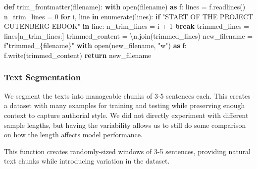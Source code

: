 \documentclass[
]{article}
\newenvironment{Shaded}{}{}
\newcommand{\BuiltInTok}[1]{\textcolor[rgb]{0.00,0.50,0.00}{#1}}
\newcommand{\CharTok}[1]{\textcolor[rgb]{0.25,0.44,0.63}{#1}}
\newcommand{\ControlFlowTok}[1]{\textcolor[rgb]{0.00,0.44,0.13}{\textbf{#1}}}
\newcommand{\DecValTok}[1]{\textcolor[rgb]{0.25,0.63,0.44}{#1}}
\newcommand{\ImportTok}[1]{\textcolor[rgb]{0.00,0.50,0.00}{\textbf{#1}}}
\newcommand{\KeywordTok}[1]{\textcolor[rgb]{0.00,0.44,0.13}{\textbf{#1}}}
\newcommand{\NormalTok}[1]{#1}
\newcommand{\OperatorTok}[1]{\textcolor[rgb]{0.40,0.40,0.40}{#1}}
\newcommand{\SpecialCharTok}[1]{\textcolor[rgb]{0.25,0.44,0.63}{#1}}
\newcommand{\SpecialStringTok}[1]{\textcolor[rgb]{0.73,0.40,0.53}{#1}}
\newcommand{\StringTok}[1]{\textcolor[rgb]{0.25,0.44,0.63}{#1}}
\begin{document}
\begin{Shaded}
\begin{Highlighting}[]
\KeywordTok{def}\NormalTok{ trim\_frontmatter(filename):}
    \ControlFlowTok{with} \BuiltInTok{open}\NormalTok{(filename) }\ImportTok{as}\NormalTok{ f:}
\NormalTok{        lines }\OperatorTok{=}\NormalTok{ f.readlines()}
\NormalTok{    n\_trim\_lines }\OperatorTok{=} \DecValTok{0}
    \ControlFlowTok{for}\NormalTok{ i, line }\KeywordTok{in} \BuiltInTok{enumerate}\NormalTok{(lines):}
        \ControlFlowTok{if} \StringTok{"START OF THE PROJECT GUTENBERG EBOOK"} \KeywordTok{in}\NormalTok{ line:}
\NormalTok{            n\_trim\_lines }\OperatorTok{=}\NormalTok{ i }\OperatorTok{+} \DecValTok{1}
            \ControlFlowTok{break}
\NormalTok{    trimmed\_lines }\OperatorTok{=}\NormalTok{ lines[n\_trim\_lines:]}
\NormalTok{    trimmed\_content }\OperatorTok{=} \StringTok{\textquotesingle{}}\CharTok{\textbackslash{}n}\StringTok{\textquotesingle{}}\NormalTok{.join(trimmed\_lines)}
\NormalTok{    new\_filename }\OperatorTok{=} \SpecialStringTok{f"trimmed\_}\SpecialCharTok{\{}\NormalTok{filename}\SpecialCharTok{\}}\SpecialStringTok{"}
    \ControlFlowTok{with} \BuiltInTok{open}\NormalTok{(new\_filename, }\StringTok{"w"}\NormalTok{) }\ImportTok{as}\NormalTok{ f:}
\NormalTok{        f.write(trimmed\_content)}
    \ControlFlowTok{return}\NormalTok{ new\_filename}
\end{Highlighting}
\end{Shaded}

\subsubsection{Text Segmentation}\label{text-segmentation}

We segment the texts into manageable chunks of 3-5 sentences each. This
creates a dataset with many examples for training and testing while
preserving enough context to capture authorial style. We did not directly experiment with different sample lengths, but having the variability allows us to still do some comparison on how the length affects model performance.

This function creates randomly-sized windows of 3-5 sentences, providing
natural text chunks while introducing variation in the dataset.
\end{document}
